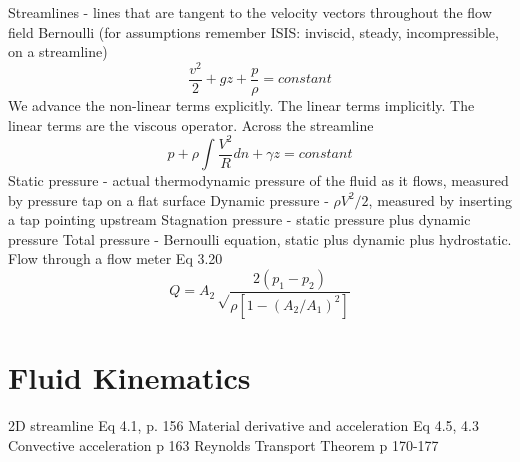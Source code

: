 \documentclass{article}
\begin{document}
Streamlines - lines that are tangent to the velocity vectors throughout the flow field
\newline
\newline
Bernoulli (for assumptions remember ISIS: inviscid, steady, incompressible, on a streamline)
\begin{equation}
  \frac{v^2}{2}+gz+\frac{p}{\rho}=constant
\end{equation}
We advance the non-linear terms explicitly. The linear terms
implicitly. The linear terms are the viscous operator. 
\newline
\newline
Across the streamline
\begin{equation}
    p + \rho\int\frac{V^2}{R}dn + \gamma z = constant
\end{equation}
\newline
\newline
Static pressure - actual thermodynamic pressure of the fluid as it flows, measured by pressure tap on a flat surface
\newline
\newline
Dynamic pressure - $\rho V^2/2$, measured by inserting a tap pointing upstream
\newline
\newline
Stagnation pressure - static pressure plus dynamic pressure
\newline
\newline
Total pressure - Bernoulli equation, static plus dynamic plus hydrostatic.
\newline
\newline
Flow through a flow meter Eq 3.20
\begin{equation}
    Q = A_2\sqrt\frac{2(p_1-p_2)}{\rho[1-(A_2/A_1)^2]}
\end{equation}


%
%
\newpage
\section{Fluid Kinematics}

2D streamline Eq 4.1, p. 156
Material derivative and acceleration Eq 4.5, 4.3
Convective acceleration p 163
Reynolds Transport Theorem p 170-177



%
%
\newpage
\end{document}
